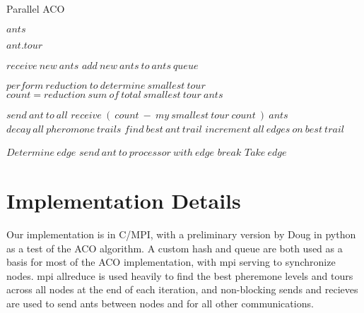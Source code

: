 \documentclass{acm_proc_article-sp}
\begin{document}
\caption{Parallel ACO}
\begin{algorithmic}[1]

        \State $ants$
            
            
                    \State $ ant.tour $
                \EndFor
                
                \State $receive\ new\ ants $
                \State $add\ new\ ants\ to\ ants\ queue $
            
            \EndWhile
            
                \State $perform\ reduction\ to\ determine\ smallest\ tour $
                \State $count = reduction\ sum\ of\ total\ smallest\ tour\ ants $
                
                    \State $send\ ant\ to\ all $
                \EndIf
                \State $ receive\ (\ count\ -\ my\ smallest\ tour\ count\ )\ ants $
                \State $ decay\ all\ pheromone\ trails $
                \State $ find\ best\ ant\ trail $
                \State $ increment\ all\ edges\ on\ best\ trail $
    
        \EndWhile
    \EndProcedure
    
            \State $Determine\ edge$
                \State $send\ ant\ to\ processor\ with\ edge$
                \State $break$
            \EndIf
            \State $Take\ edge$
        \EndWhile
    \EndProcedure
    
\end{algorithmic}

\section{Implementation Details}
Our implementation is in C/MPI, with a preliminary version by Doug in python as a test of the ACO algorithm. A custom hash and queue are both used as a basis for most of the ACO implementation, with mpi serving to synchronize nodes. mpi allreduce is used heavily to find the best pheremone levels and tours across all nodes at the end of each iteration, and non-blocking sends and recieves are used to send ants between nodes and for all other communications. 
\end{document}
